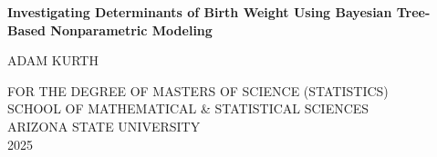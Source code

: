 \begin{titlepage}
    \begin{center}
        \vspace*{2cm}

        \Large
        {\bf Investigating Determinants of Birth Weight Using Bayesian Tree-Based Nonparametric Modeling}

        \vspace{4cm}

        \large
        ADAM KURTH

        \vfill

        \normalsize
        FOR THE DEGREE OF MASTERS OF SCIENCE (STATISTICS)\\
        SCHOOL OF MATHEMATICAL \& STATISTICAL SCIENCES\\
        ARIZONA STATE UNIVERSITY\\[2cm]

        2025

    \end{center}
\end{titlepage}